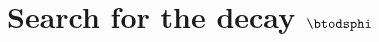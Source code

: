 \chapter{Search for the decay %
  \texorpdfstring{$\boldsymbol{\btodsphi}$}{\btodsphi}}
\label{ch:dsphi}















\clearpage




